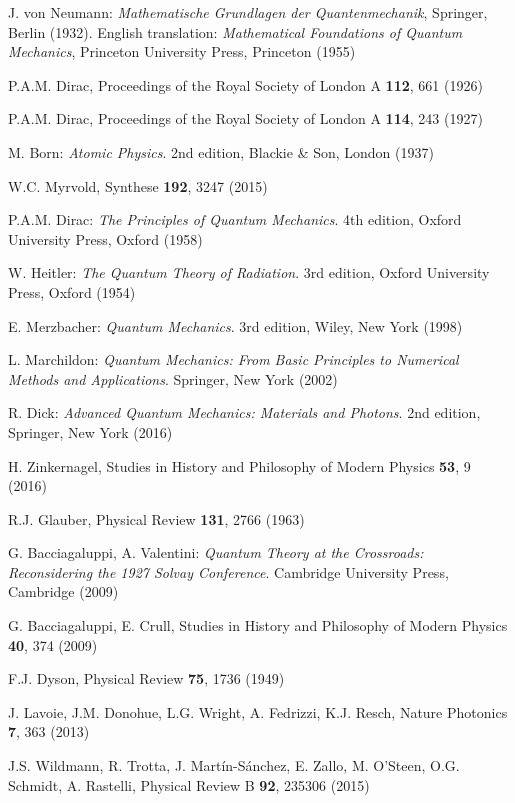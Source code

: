 \documentclass[final,3p,12pt]{elsarticle3}
\begin{document}
\begin{thebibliography}{88}
J. von Neumann: {\it Mathematische Grundlagen der Quantenmechanik},
Springer, Berlin (1932). English translation:
{\it Mathematical Foundations of Quantum Mechanics},
Princeton University Press, Princeton (1955)

P.A.M. Dirac,
Proceedings of the Royal Society of London A {\bf 112}, 661 (1926)

P.A.M. Dirac,
Proceedings of the Royal Society of London A {\bf 114}, 243 (1927)

M. Born: {\it Atomic Physics}. 2nd edition, Blackie \& Son, London (1937)

W.C. Myrvold, Synthese {\bf 192}, 3247 (2015)

P.A.M. Dirac: {\it The Principles of Quantum Mechanics}. 4th edition,
Oxford University Press, Oxford (1958)

W. Heitler: {\it The Quantum Theory of Radiation}. 3rd edition,
Oxford University Press, Oxford (1954)

E. Merzbacher: {\it Quantum Mechanics}. 3rd edition, Wiley, New York (1998)

L. Marchildon: {\it Quantum Mechanics: From Basic Principles to Numerical 
Methods and Applications}. Springer, New York (2002)

R. Dick: {\it Advanced Quantum Mechanics: Materials and Photons}.
2nd edition, Springer, New York (2016)

H. Zinkernagel, Studies in History and Philosophy of Modern Physics {\bf 53}, 9 (2016)

R.J. Glauber, Physical Review {\bf 131}, 2766 (1963)

G. Bacciagaluppi, A. Valentini: {\it Quantum Theory at the Crossroads:
Reconsidering the 1927 Solvay Conference}. Cambridge University Press, 
Cambridge (2009)

G. Bacciagaluppi, E. Crull, 
Studies in History and Philosophy of Modern Physics {\bf 40}, 374 (2009)

F.J. Dyson, Physical Review {\bf 75}, 1736 (1949)

J. Lavoie, J.M. Donohue, L.G. Wright, A. Fedrizzi,
K.J. Resch, Nature Photonics {\bf 7}, 363 (2013)

J.S. Wildmann, R. Trotta, J. Mart\'in-S\'anchez, E. Zallo,
M. O'Steen, O.G. Schmidt,  A. Rastelli,
Physical Review B {\bf 92}, 235306 (2015)


\end{thebibliography}
\end{document}
